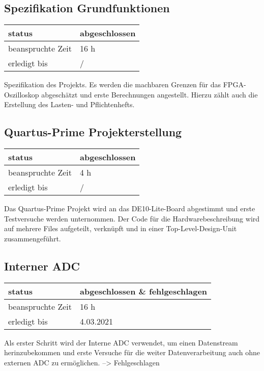 \subsection{Spezifikation Grundfunktionen}

\begin{tabular}[h]{|l|l|} %
	\hline
	status & abgeschlossen\\
	\hline
	beanspruchte Zeit & 16 h\\
	\hline
	erledigt bis & / \\
	\hline
\end{tabular}
Spezifikation des Projekts. Es werden die machbaren Grenzen für das FPGA-Oszilloskop abgeschätzt und erste Berechnungen angestellt. Hierzu zählt auch die Erstellung des Lasten- und Pflichtenhefts.

\subsection{Quartus-Prime Projekterstellung}

\begin{tabular}[h]{|l|l|} %
	\hline
	status & abgeschlossen\\
	\hline
	beanspruchte Zeit & 4 h\\
	\hline
	erledigt bis & / \\
	\hline
\end{tabular}
Das Quartus-Prime Projekt wird an das DE10-Lite-Board abgestimmt und erste Testversuche werden unternommen. Der Code für die Hardwarebeschreibung wird auf mehrere Files aufgeteilt, verknüpft und in einer Top-Level-Design-Unit zusammengeführt. 

\subsection{Interner ADC}

\begin{tabular}[h]{|l|l|} %
	\hline
	status & abgeschlossen \& fehlgeschlagen\\
	\hline
	beanspruchte Zeit & 16 h\\
	\hline
	erledigt bis & 4.03.2021 \\
	\hline
\end{tabular}
Als erster Schritt wird der Interne ADC verwendet, um einen Datenstream herinzubekommen und erste Versuche für die weiter Datenverarbeitung auch ohne externen ADC zu ermöglichen. --> Fehlgeschlagen

